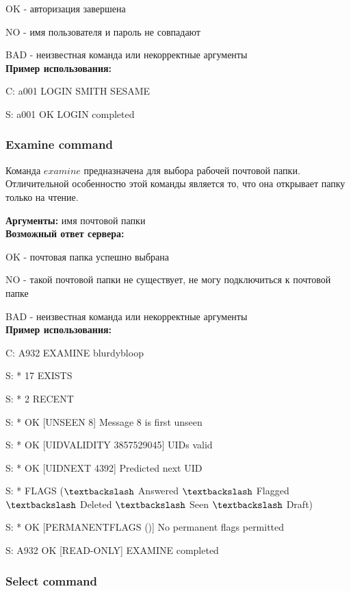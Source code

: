 \documentclass[a4paper,14pt]{extarticle}
\begin{document}
        OK - авторизация завершена

        NO - имя пользователя и пароль не совпадают

        BAD - неизвестная команда или некорректные аргументы \\


        \textbf{Пример использования:}  

        C: a001 LOGIN SMITH SESAME

        S: a001 OK LOGIN completed


    \subsubsection{Examine command}

        Команда $examine$ предназначена для выбора рабочей почтовой папки.
        Отличительной особенностю этой команды является то, что она открывает папку только на чтение.

        \textbf{Аргументы:}  имя почтовой папки \\

        \textbf{Возможный ответ сервера:}

        OK - почтовая папка успешно выбрана

        NO - такой почтовой папки не существует, не могу подключиться к почтовой папке

        BAD - неизвестная команда или некорректные аргументы \\


        \textbf{Пример использования:}  

        C: A932 EXAMINE blurdybloop

        S: * 17 EXISTS

        S: * 2 RECENT

        S: * OK [UNSEEN 8] Message 8 is first unseen

        S: * OK [UIDVALIDITY 3857529045] UIDs valid

        S: * OK [UIDNEXT 4392] Predicted next UID

        S: * FLAGS ($\textbackslash$ Answered $\textbackslash$ Flagged
        $\textbackslash$ Deleted $\textbackslash$ Seen $\textbackslash$ Draft)

        S: * OK [PERMANENTFLAGS ()] No permanent flags permitted

        S: A932 OK [READ-ONLY] EXAMINE completed

    \subsubsection{Select command}
\end{document}
